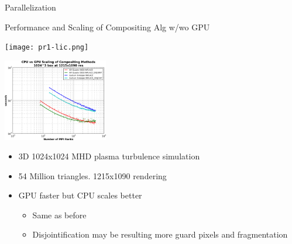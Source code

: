 \documentclass[notes]{beamer}
\begin{document}
\begin{frame}{Parallelization}
    \begin{beamerboxesrounded}{Performance and Scaling of Compositing Alg w/wo GPU}
    \begin{minipage}{0.55\linewidth}
    \texttt{[image: pr1-lic.png]}
    \end{minipage}
    \begin{minipage}{0.45\linewidth}
    \includegraphics[width=1.8in]{scaling-composite-cube-gpu.png} \\
    \vspace{-0.1in}
    \begin{itemize}
    \setlength{\itemindent}{-1em}
    \scriptsize
    \item 3D 1024x1024 MHD plasma turbulence simulation
    \item 54 Million triangles. 1215x1090 rendering
    \item GPU faster but CPU scales better
    \begin{itemize}
    \setlength{\itemindent}{-3em}
    \scriptsize
    \item Same as before
    \item Disjointification may be resulting more guard pixels and fragmentation
    \end{itemize}
    \end{itemize}
    \end{minipage}
    \end{beamerboxesrounded}
\end{frame}
\end{document}
